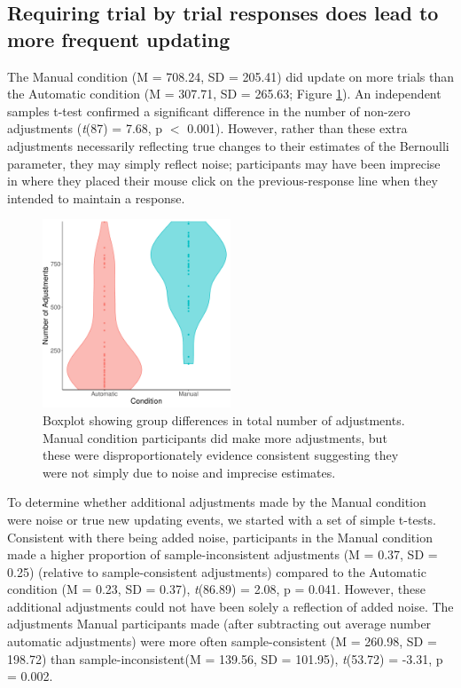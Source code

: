 \documentclass[sn-apa]{sn-jnl}\usepackage[]{graphicx}\usepackage[]{xcolor}
\newenvironment{knitrout}{}{} %
\begin{document}
\subsection{Requiring trial by trial responses does lead to more frequent updating}

The Manual condition (M = 708.24, SD = 205.41) did update on more trials than the Automatic condition (M = 307.71, SD = 265.63; Figure \ref{fig:gross-diff}). An independent samples t-test confirmed a significant difference in the number of non-zero adjustments (\textit{t}(87) = 7.68, p \(<\) 0.001). However, rather than these extra adjustments necessarily reflecting true changes to their estimates of the Bernoulli parameter, they may simply reflect noise; participants may have been imprecise in where they placed their mouse click on the previous-response line when they intended to maintain a response.

\begin{figure}[htp]
\centering
\begin{knitrout}
\color{fgcolor}
\includegraphics[width=0.5\textwidth]{figure/unnamed-chunk-9-1} 
\end{knitrout}
\caption{Boxplot showing group differences in total number of adjustments. Manual condition participants did make more adjustments, but these were disproportionately evidence consistent suggesting they were not simply due to noise and imprecise estimates.}
\label{fig:gross-diff}
\end{figure}






To determine whether additional adjustments made by the Manual condition were noise or true new updating events, we started with a set of simple t-tests. Consistent with there being added noise, participants in the Manual condition made a higher proportion of sample-inconsistent adjustments (M = 0.37, SD = 0.25) (relative to sample-consistent adjustments) compared to the Automatic condition (M = 0.23, SD = 0.37), \textit{t}(86.89) = 2.08, p = 0.041. However, these additional adjustments could not have been solely a reflection of added noise. The adjustments Manual participants made (after subtracting out average number automatic adjustments) were more often sample-consistent (M = 260.98, SD = 198.72) than sample-inconsistent(M = 139.56, SD = 101.95), \textit{t}(53.72) = -3.31, p = 0.002.
\end{document}
